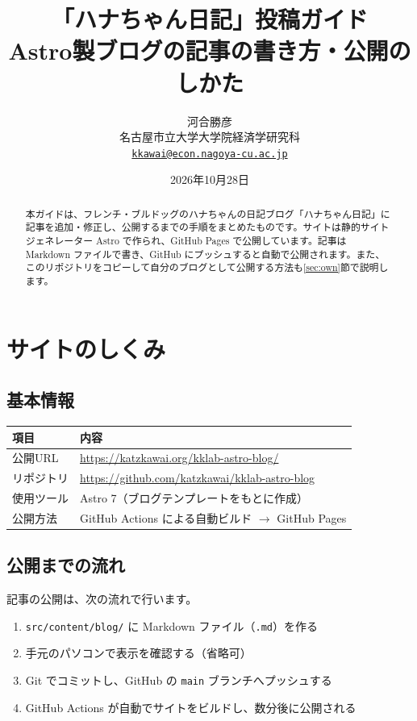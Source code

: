 \documentclass[a4paper,11pt]{ltjsarticle}
\title{「ハナちゃん日記」投稿ガイド\\[0.5em]
  \large Astro製ブログの記事の書き方・公開のしかた}
\author{河合勝彦\\[0.3em]
  \small 名古屋市立大学大学院経済学研究科\\
  \small \href{mailto:kkawai@econ.nagoya-cu.ac.jp}{\texttt{kkawai@econ.nagoya-cu.ac.jp}}}
\date{2026年10月28日}
\newcommand{\file}[1]{\texttt{#1}}
\begin{document}
\maketitle

\begin{abstract}
本ガイドは、フレンチ・ブルドッグのハナちゃんの日記ブログ「ハナちゃん日記」に記事を追加・修正し、公開するまでの手順をまとめたものです。サイトは静的サイトジェネレーター Astro で作られ、GitHub Pages で公開しています。記事は Markdown ファイルで書き、GitHub にプッシュすると自動で公開されます。また、このリポジトリをコピーして自分のブログとして公開する方法も\ref{sec:own}節で説明します。
\end{abstract}

\tableofcontents
\clearpage

\section{サイトのしくみ}

\subsection{基本情報}

\begin{center}
\begin{tabular}{@{}ll@{}}
\toprule
項目 & 内容 \\
\midrule
公開URL & \url{https://katzkawai.org/kklab-astro-blog/} \\
リポジトリ & \url{https://github.com/katzkawai/kklab-astro-blog} \\
使用ツール & Astro 7（ブログテンプレートをもとに作成） \\
公開方法 & GitHub Actions による自動ビルド $\to$ GitHub Pages \\
\bottomrule
\end{tabular}
\end{center}

\subsection{公開までの流れ}

記事の公開は、次の流れで行います。

\begin{enumerate}
  \item \file{src/content/blog/} に Markdown ファイル（\file{.md}）を作る
  \item 手元のパソコンで表示を確認する（省略可）
  \item Git でコミットし、GitHub の \file{main} ブランチへプッシュする
  \item GitHub Actions が自動でサイトをビルドし、数分後に公開される
\end{enumerate}
\end{document}
